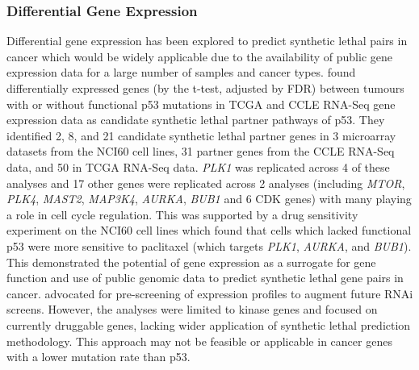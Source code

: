 \subsubsection{Differential Gene Expression}

Differential gene expression has been explored to predict \gls{synthetic lethal} pairs in cancer which would be widely applicable due to the availability of public gene expression data for a large number of samples and cancer types. \citet{Wang2013} found differentially expressed genes (by the t-test, adjusted by FDR) between tumours with or without functional p53 mutations in \gls{TCGA} \citep{TCGA2008GBM} and \gls{CCLE} \citep{Barretina2012} \gls{RNA-Seq} gene expression data as candidate \gls{synthetic lethal} partner pathways of p53. They identified 2, 8, and 21 candidate \gls{synthetic lethal} partner genes in 3 microarray datasets from the NCI60 cell lines, 31 partner genes from the \gls{CCLE} \gls{RNA-Seq} data, and 50 in \gls{TCGA} \gls{RNA-Seq} data. \textit{PLK1} was replicated across 4 of these analyses and 17 other genes were replicated across 2 analyses (including \textit{MTOR}, \textit{PLK4}, \textit{MAST2}, \textit{MAP3K4}, \textit{AURKA}, \textit{BUB1} and 6 CDK genes) with many playing a role in cell cycle regulation. This was supported by a drug sensitivity experiment on the NCI60 cell lines which found that cells which lacked functional p53 were more sensitive to paclitaxel (which targets \textit{PLK1}, \textit{AURKA}, and \textit{BUB1}). This demonstrated the potential of gene expression as a surrogate for gene function and use of public genomic data to predict \gls{synthetic lethal} gene pairs in cancer. \citet{Wang2013} advocated for pre-screening of expression profiles to augment future \gls{RNAi} screens. However, the analyses were limited to kinase genes and focused on currently druggable genes, lacking wider application of \gls{synthetic lethal} prediction methodology. This approach may not be feasible or applicable in cancer genes with a lower mutation rate than p53.  


